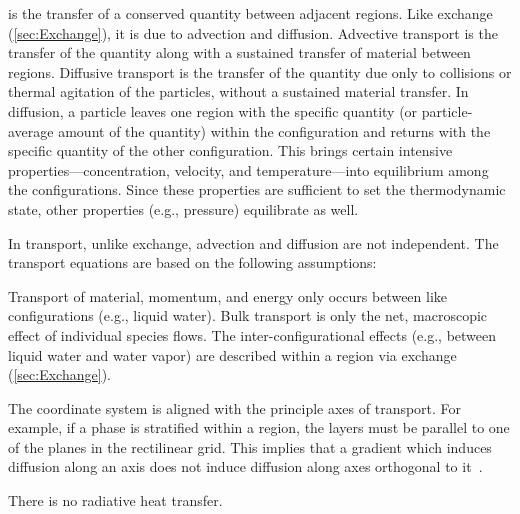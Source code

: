
\emph{} is the transfer of a conserved quantity between adjacent regions.  Like exchange (\autoref{sec:Exchange}), it is due to advection and diffusion.  Advective transport is the transfer of the quantity along with a sustained transfer of material between regions.  Diffusive transport is the transfer of the quantity due only to collisions or thermal agitation of the particles, without a sustained material transfer.  In diffusion, a particle leaves one region with the specific quantity (or particle-average amount of the quantity) within the configuration and returns with the specific quantity of the other configuration.  This brings certain intensive properties---concentration, velocity, and temperature---into equilibrium among the configurations.  Since these properties are sufficient to set the thermodynamic state, other properties (e.g., pressure) equilibrate as well.

In transport, unlike exchange, advection and diffusion are not independent.  The transport equations are based on the following assumptions:
\begin{enumerate*}

  \item Transport of material, momentum, and energy only occurs between like configurations (e.g., liquid water).  Bulk transport is only the net, macroscopic effect of individual species flows.  The inter-configurational effects (e.g., between liquid water and water vapor) are described within a region via exchange (\autoref{sec:Exchange}).

  \item \label{itm:AssumeAligned} The coordinate system is aligned with the principle axes of transport.  For example, if a phase is stratified within a region, the layers must be parallel to one of the planes in the rectilinear grid.  This implies that a gradient which induces diffusion along an axis does not induce diffusion along axes orthogonal to it~\cite{Bejan2006}.%
  \item There is no radiative heat transfer.
\end{enumerate*}

